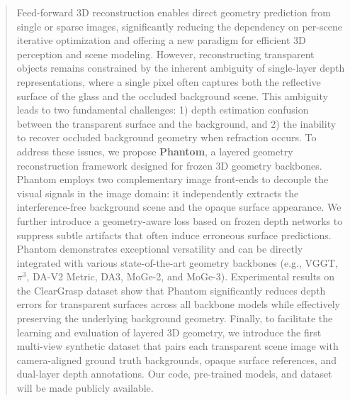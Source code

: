 \begin{abstract}
Feed-forward 3D reconstruction enables direct geometry prediction from single or sparse images, significantly reducing the dependency on per-scene iterative optimization and offering a new paradigm for efficient 3D perception and scene modeling. However, reconstructing transparent objects remains constrained by the inherent ambiguity of single-layer depth representations, where a single pixel often captures both the reflective surface of the glass and the occluded background scene. This ambiguity leads to two fundamental challenges: 1) depth estimation confusion between the transparent surface and the background, and 2) the inability to recover occluded background geometry when refraction occurs. To address these issues, we propose \textbf{Phantom}, a layered geometry reconstruction framework designed for frozen 3D geometry backbones. Phantom employs two complementary image front-ends to decouple the visual signals in the image domain: it independently extracts the interference-free background scene and the opaque surface appearance. We further introduce a geometry-aware loss based on frozen depth networks to suppress subtle artifacts that often induce erroneous surface predictions. Phantom demonstrates exceptional versatility and can be directly integrated with various state-of-the-art geometry backbones (e.g., VGGT, $\pi^3$, DA-V2 Metric, DA3, MoGe-2, and MoGe-3). Experimental results on the ClearGrasp dataset show that Phantom significantly reduces depth errors for transparent surfaces across all backbone models while effectively preserving the underlying background geometry. Finally, to facilitate the learning and evaluation of layered 3D geometry, we introduce the first multi-view synthetic dataset that pairs each transparent scene image with camera-aligned ground truth backgrounds, opaque surface references, and dual-layer depth annotations. Our code, pre-trained models, and dataset will be made publicly available.
\end{abstract}
